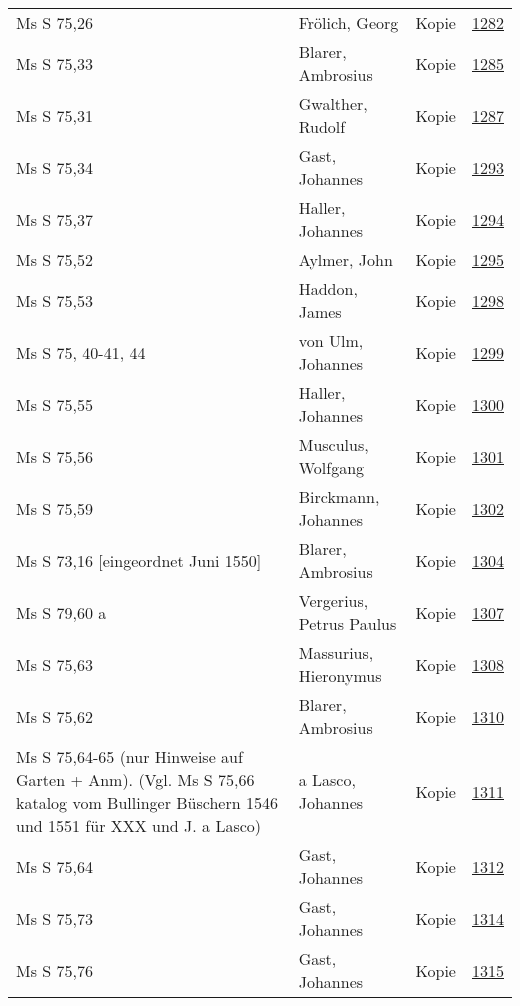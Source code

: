 \documentclass[10pt,a4paper,landscape]{report}
\begin{document}
\begin{longtable}{p{16cm}p{4cm}lr}
Ms S 75,26	&	Frölich, Georg	&	Kopie	&	\href{http://130.60.24.72/assignment/1282}{1282}\\
Ms S 75,33	&	Blarer, Ambrosius	&	Kopie	&	\href{http://130.60.24.72/assignment/1285}{1285}\\
Ms S 75,31	&	Gwalther, Rudolf	&	Kopie	&	\href{http://130.60.24.72/assignment/1287}{1287}\\
Ms S 75,34	&	Gast, Johannes	&	Kopie	&	\href{http://130.60.24.72/assignment/1293}{1293}\\
Ms S 75,37	&	Haller, Johannes	&	Kopie	&	\href{http://130.60.24.72/assignment/1294}{1294}\\
Ms S 75,52	&	Aylmer, John	&	Kopie	&	\href{http://130.60.24.72/assignment/1295}{1295}\\
Ms S 75,53	&	Haddon, James	&	Kopie	&	\href{http://130.60.24.72/assignment/1298}{1298}\\
Ms S 75, 40-41, 44	&	von Ulm, Johannes	&	Kopie	&	\href{http://130.60.24.72/assignment/1299}{1299}\\
Ms S 75,55	&	Haller, Johannes	&	Kopie	&	\href{http://130.60.24.72/assignment/1300}{1300}\\
Ms S 75,56	&	Musculus, Wolfgang	&	Kopie	&	\href{http://130.60.24.72/assignment/1301}{1301}\\
Ms S 75,59	&	Birckmann, Johannes	&	Kopie	&	\href{http://130.60.24.72/assignment/1302}{1302}\\
Ms S 73,16 [eingeordnet Juni 1550]	&	Blarer, Ambrosius	&	Kopie	&	\href{http://130.60.24.72/assignment/1304}{1304}\\
Ms S 79,60 a	&	Vergerius, Petrus Paulus	&	Kopie	&	\href{http://130.60.24.72/assignment/1307}{1307}\\
Ms S 75,63	&	Massurius, Hieronymus	&	Kopie	&	\href{http://130.60.24.72/assignment/1308}{1308}\\
Ms S 75,62	&	Blarer, Ambrosius	&	Kopie	&	\href{http://130.60.24.72/assignment/1310}{1310}\\
Ms S 75,64-65 (nur Hinweise auf Garten + Anm). (Vgl. Ms S 75,66 katalog vom Bullinger Büschern 1546 und 1551 für XXX und J. a Lasco)	&	a Lasco, Johannes	&	Kopie	&	\href{http://130.60.24.72/assignment/1311}{1311}\\
Ms S 75,64	&	Gast, Johannes	&	Kopie	&	\href{http://130.60.24.72/assignment/1312}{1312}\\
Ms S 75,73	&	Gast, Johannes	&	Kopie	&	\href{http://130.60.24.72/assignment/1314}{1314}\\
Ms S 75,76	&	Gast, Johannes	&	Kopie	&	\href{http://130.60.24.72/assignment/1315}{1315}\\

\end{longtable}
\end{document}
